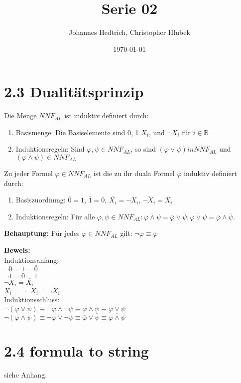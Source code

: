 \documentclass[12pt,a4paper]{scrartcl}
\title{Serie 02}
\author{Johannes Hedtrich, Christopher Hlubek}
\date{\today}
\begin{document}
\section*{2.3 Dualitätsprinzip}

Die Menge $NNF_{AL}$ ist induktiv definiert durch:
\begin{enumerate}
  \item Basismenge: Die Basiselemente sind 0, 1 $X_i$, und $\neg X_i$ für $i \in \mathbb{B}$
  \item Induktionsregeln: Sind $\varphi, \psi \in NNF_{AL}$, so sind $(\varphi \vee \psi) in NNF_{AL}$ und $(\varphi \wedge \psi) \in NNF_{AL}$
\end{enumerate}

Zu jeder Formel $\varphi \in NNF_{AL}$ ist die zu ihr duala Formel $\overline{\varphi}$ induktiv definiert durch:
\begin{enumerate}
  \item Basiszuordnung: $\overline{0} = 1$, $\overline{1} = 0$, $\overline{X_i} = \neg X_i$, $\overline{\neg X_i} = X_i$
  \item Induktionsregeln: Für alle $\varphi, \psi \in NNF_{AL}: \overline{\varphi \wedge \psi} = \overline{\varphi} \vee \overline{\psi}, \overline{\varphi \vee \psi} = \overline{\varphi} \wedge \overline{\psi}$.
\end{enumerate}

\textbf{Behauptung:} Für jedes $\varphi \in NNF_{AL}$ gilt: $\neg \varphi \equiv \overline{\varphi}$

\textbf{Beweis:}\\
Induktionsanfang:\\
$\neg 0 = 1 = \overline{0}$\\
$\neg 1 = 0 = \overline{1}$\\
$\neg X_i = \overline{X_i}$\\
$X_i = \neg \neg X_i = \overline{\neg X_i}$\\

Induktionsschluss:\\
$\neg (\varphi \vee \psi) \equiv \neg \varphi \wedge \neg \psi \equiv \overline{\varphi} \wedge \overline{\psi} \equiv \overline{\varphi \vee \psi}$\\
$\neg (\varphi \wedge \psi) \equiv \neg \varphi \vee \neg \psi \equiv \overline{\varphi} \vee \overline{\psi} \equiv \overline{\varphi \wedge \psi}$\\

\section*{2.4 formula to string}
siehe Anhang.

\end{document}
